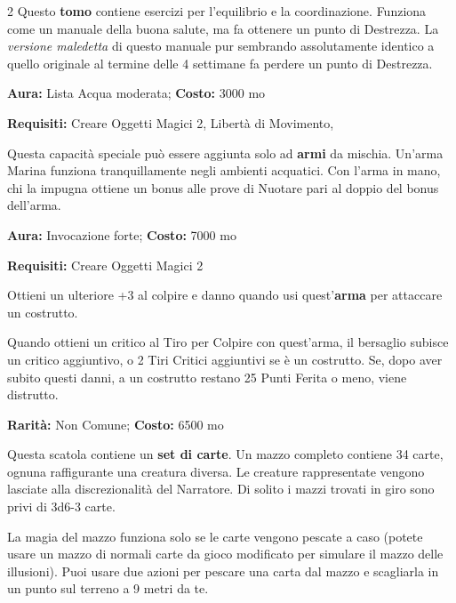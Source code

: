 \begin{multicols}{2}
Questo \textbf{tomo} contiene esercizi per l'equilibrio e la coordinazione. Funziona come un manuale della buona salute, ma fa ottenere un punto di Destrezza. La \emph{versione maledetta} di questo manuale pur sembrando assolutamente identico a quello originale al termine delle 4 settimane fa perdere un punto di Destrezza.


\textbf{Aura:} Lista Acqua moderata; \textbf{Costo:} 3000 mo

\textbf{Requisiti:} Creare Oggetti Magici 2, Libertà di Movimento,

Questa capacità speciale può essere aggiunta solo ad \textbf{armi} da mischia. Un'arma Marina funziona tranquillamente negli ambienti acquatici. Con l'arma in mano, chi la impugna ottiene un bonus alle prove di Nuotare pari al doppio del bonus dell'arma.


\textbf{Aura:} Invocazione forte; \textbf{Costo:} 7000 mo

\textbf{Requisiti:} Creare Oggetti Magici 2

Ottieni un ulteriore +3 al colpire e danno quando usi quest'\textbf{arma} per attaccare un costrutto.

Quando ottieni un critico al Tiro per Colpire con quest'arma, il bersaglio subisce un critico aggiuntivo, o 2 Tiri Critici aggiuntivi se è un costrutto. Se, dopo aver subito questi danni, a un costrutto restano 25 Punti Ferita o meno, viene distrutto.


\textbf{Rarità:} Non Comune; \textbf{Costo:} 6500 mo

Questa scatola contiene un \textbf{set di carte}. Un mazzo completo contiene 34 carte, ognuna raffigurante una creatura diversa. Le creature rappresentate vengono lasciate alla discrezionalità del Narratore. Di solito i mazzi trovati in giro sono privi di 3d6-3 carte.

La magia del mazzo funziona solo se le carte vengono pescate a caso (potete usare un mazzo di normali carte da gioco modificato per simulare il mazzo delle illusioni). Puoi usare due azioni per pescare una carta dal mazzo e scagliarla in un punto sul terreno a 9 metri da te.


\end{multicols}
